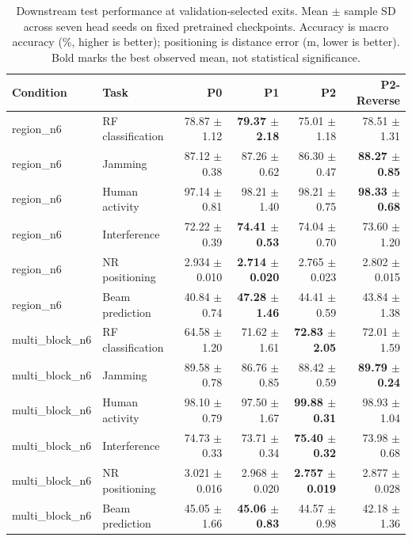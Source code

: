 \begin{table}[t]
\centering
\caption{Downstream test performance at validation-selected exits. Mean $\pm$ sample SD across seven head seeds on fixed pretrained checkpoints. Accuracy is macro accuracy (\%, higher is better); positioning is distance error (m, lower is better). Bold marks the best observed mean, not statistical significance.}
\begin{tabular}{llrrrr}
\hline
Condition & Task & P0 & P1 & P2 & P2-Reverse \\
\hline
region\_n6 & RF classification & 78.87 $\pm$ 1.12 & \textbf{79.37 $\pm$ 2.18} & 75.01 $\pm$ 1.18 & 78.51 $\pm$ 1.31 \\
region\_n6 & Jamming & 87.12 $\pm$ 0.38 & 87.26 $\pm$ 0.62 & 86.30 $\pm$ 0.47 & \textbf{88.27 $\pm$ 0.85} \\
region\_n6 & Human activity & 97.14 $\pm$ 0.81 & 98.21 $\pm$ 1.40 & 98.21 $\pm$ 0.75 & \textbf{98.33 $\pm$ 0.68} \\
region\_n6 & Interference & 72.22 $\pm$ 0.39 & \textbf{74.41 $\pm$ 0.53} & 74.04 $\pm$ 0.70 & 73.60 $\pm$ 1.20 \\
region\_n6 & NR positioning & 2.934 $\pm$ 0.010 & \textbf{2.714 $\pm$ 0.020} & 2.765 $\pm$ 0.023 & 2.802 $\pm$ 0.015 \\
region\_n6 & Beam prediction & 40.84 $\pm$ 0.74 & \textbf{47.28 $\pm$ 1.46} & 44.41 $\pm$ 0.59 & 43.84 $\pm$ 1.38 \\
\hline
multi\_block\_n6 & RF classification & 64.58 $\pm$ 1.20 & 71.62 $\pm$ 1.61 & \textbf{72.83 $\pm$ 2.05} & 72.01 $\pm$ 1.59 \\
multi\_block\_n6 & Jamming & 89.58 $\pm$ 0.78 & 86.76 $\pm$ 0.85 & 88.42 $\pm$ 0.59 & \textbf{89.79 $\pm$ 0.24} \\
multi\_block\_n6 & Human activity & 98.10 $\pm$ 0.79 & 97.50 $\pm$ 1.67 & \textbf{99.88 $\pm$ 0.31} & 98.93 $\pm$ 1.04 \\
multi\_block\_n6 & Interference & 74.73 $\pm$ 0.33 & 73.71 $\pm$ 0.34 & \textbf{75.40 $\pm$ 0.32} & 73.98 $\pm$ 0.68 \\
multi\_block\_n6 & NR positioning & 3.021 $\pm$ 0.016 & 2.968 $\pm$ 0.020 & \textbf{2.757 $\pm$ 0.019} & 2.877 $\pm$ 0.028 \\
multi\_block\_n6 & Beam prediction & 45.05 $\pm$ 1.66 & \textbf{45.06 $\pm$ 0.83} & 44.57 $\pm$ 0.98 & 42.18 $\pm$ 1.36 \\
\hline
\end{tabular}
\end{table}
